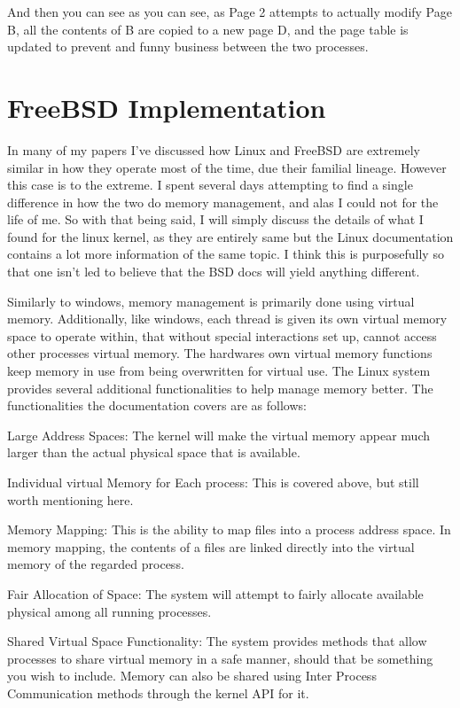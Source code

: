 \documentclass[10pt,draftclsnofoot,onecolumn]{IEEEtran}
\begin{document}
And then you can see as you can see, as Page 2 attempts to actually modify Page
B, all the contents of B are copied to a new page D, and the page table is updated
to prevent and funny business between the two processes.



\newpage
\section{FreeBSD Implementation}

In many of my papers I've discussed how Linux and FreeBSD are extremely similar
in how they operate most of the time, due their familial lineage. However this
case is to the extreme. I spent several days attempting to find a single
difference in how the two do memory management, and alas I could not for the life
of me. So with that being said, I will simply discuss the details of what I found
for the linux kernel, as they are entirely same but the Linux documentation
contains a lot more information of the same topic. I think this is purposefully
so that one isn't led to believe that the BSD docs will yield anything different.

Similarly to windows, memory management is primarily done using virtual memory.
Additionally, like windows, each thread is given its own virtual memory space
to operate within, that without special interactions set up, cannot access other
processes virtual memory. The hardwares own virtual memory functions keep memory
in use from being overwritten for virtual use. The Linux system provides several
additional functionalities to help manage memory better. The functionalities the
documentation covers are as follows:

Large Address Spaces: The kernel will make the virtual memory appear much larger
than the actual physical space that is available.

Individual virtual Memory for Each process: This is covered above, but still worth
mentioning here.

Memory Mapping: This is the ability to map files into a process address space.
In memory mapping, the contents of a files are linked directly into the virtual
memory of the regarded process.

Fair Allocation of Space: The system will attempt to fairly allocate available
physical among all running processes.

Shared Virtual Space Functionality: The system provides methods that allow
processes to share virtual memory in a safe manner, should that be something you
wish to include. Memory can also be shared using Inter Process Communication
methods through the kernel API for it.
\end{document}
